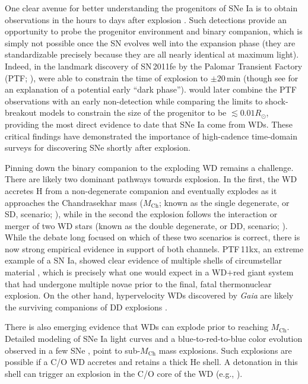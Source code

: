 \documentclass[twocolumn]{./aastex63}
\begin{document}
One clear avenue for better understanding the progenitors of SNe Ia is to
obtain observations in the hours to days after explosion \citep{Maoz14}. Such
detections provide an opportunity to probe the progenitor environment and
binary companion, which is simply not possible once the SN evolves well into
the expansion phase (they are standardizable precisely because they are all
nearly identical at maximum light). Indeed, in the landmark discovery of
SN\,2011fe by the Palomar Transient Factory (PTF; \citealt{law09,rau09}),
\citet{Nugent11} were able to constrain the time of explosion to $\pm 20$\,min
(though see \citealt{Piro13} for an explanation of a potential early ``dark
phase''). \citet{Bloom12a} would later combine the PTF observations with an
early non-detection while comparing the limits to shock-breakout models to
constrain the size of the progenitor to be $\lesssim 0.01 R_\odot$, providing
the most direct evidence to date that SNe Ia come from WDs. These critical
findings have demonstrated the importance of high-cadence time-domain surveys
for discovering SNe shortly after explosion.

Pinning down the binary companion to the exploding WD remains a challenge.
There are likely two dominant pathways towards explosion. In the first, the WD
accretes H from a non-degenerate companion and eventually explodes as it
approaches the Chandrasekhar mass ($M_\mathrm{Ch}$; known as the single
degenerate, or SD, scenario; \citealt{Whelan73}), while in the second the
explosion follows the interaction or merger of two WD stars (known as the
double degenerate, or DD, scenario; \citealt{Webbink84}). While the debate
long focused on which of these two scenarios is correct, there is now strong
empirical evidence in support of both channels. PTF\,11kx, an extreme example
of a SN Ia, showed clear evidence of multiple shells of circumstellar material
\citep{Dilday12}, which is precisely what one would expect in a WD$+$red giant
system that had undergone multiple novae prior to the final, fatal
thermonuclear explosion. On the other hand, hypervelocity WDs discovered by
\textit{Gaia} are likely the surviving companions of DD explosions
\citep{Shen18}.

There is also emerging evidence that WDs can explode prior to reaching
$M_\mathrm{Ch}$. Detailed modeling of SNe Ia light curves \citep{Scalzo14a} and
a blue-to-red-to-blue color evolution observed in a few SNe
\citep{Jiang17,Noebauer17,Polin19,De19}, point to sub-$M_\mathrm{Ch}$ mass
explosions. Such explosions are possible if a C/O WD accretes and retains a
thick He shell. A detonation in this shell can trigger an explosion in the C/O
core of the WD (e.g., \citealt{Nomoto82,Nomoto82a}). 
\end{document}
